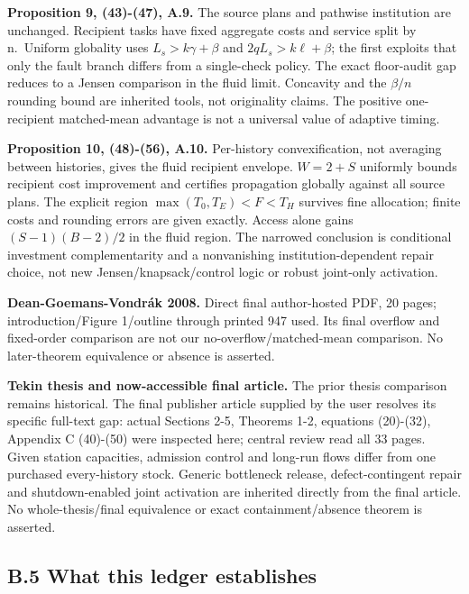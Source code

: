 \documentclass[
  11pt,
  a4paper,
]{article}
\begin{document}
\textbf{Proposition 9, (43)-(47), A.9.} The source plans and pathwise
institution are unchanged. Recipient tasks have fixed aggregate costs
and service split by n.~Uniform globality uses \(L_s>k\gamma+\beta\) and
\(2qL_s>k\ell+\beta\); the first exploits that only the fault branch
differs from a single-check policy. The exact floor-audit gap reduces to
a Jensen comparison in the fluid limit. Concavity and the \(\beta/n\)
rounding bound are inherited tools, not originality claims. The positive
one-recipient matched-mean advantage is not a universal value of
adaptive timing.

\textbf{Proposition 10, (48)-(56), A.10.} Per-history convexification,
not averaging between histories, gives the fluid recipient envelope.
\(W=2+S\) uniformly bounds recipient cost improvement and certifies
propagation globally against all source plans. The explicit region
\(\max(T_0,T_E)<F<T_H\) survives fine allocation; finite costs and
rounding errors are given exactly. Access alone gains \((S-1)(B-2)/2\)
in the fluid region. The narrowed conclusion is conditional investment
complementarity and a nonvanishing institution-dependent repair choice,
not new Jensen/knapsack/control logic or robust joint-only activation.

\textbf{Dean-Goemans-Vondrák 2008.} Direct final author-hosted PDF, 20
pages; introduction/Figure 1/outline through printed 947 used. Its final
overflow and fixed-order comparison are not our no-overflow/matched-mean
comparison. No later-theorem equivalence or absence is asserted.

\textbf{Tekin thesis and now-accessible final article.} The prior thesis
comparison remains historical. The final publisher article supplied by
the user resolves its specific full-text gap: actual Sections 2-5,
Theorems 1-2, equations (20)-(32), Appendix C (40)-(50) were inspected
here; central review read all 33 pages. Given station capacities,
admission control and long-run flows differ from one purchased
every-history stock. Generic bottleneck release, defect-contingent
repair and shutdown-enabled joint activation are inherited directly from
the final article. No whole-thesis/final equivalence or exact
containment/absence theorem is asserted.

\hypertarget{b.5-what-this-ledger-establishes}{%
\subsection{B.5 What this ledger
establishes}\label{b.5-what-this-ledger-establishes}}
\end{document}
